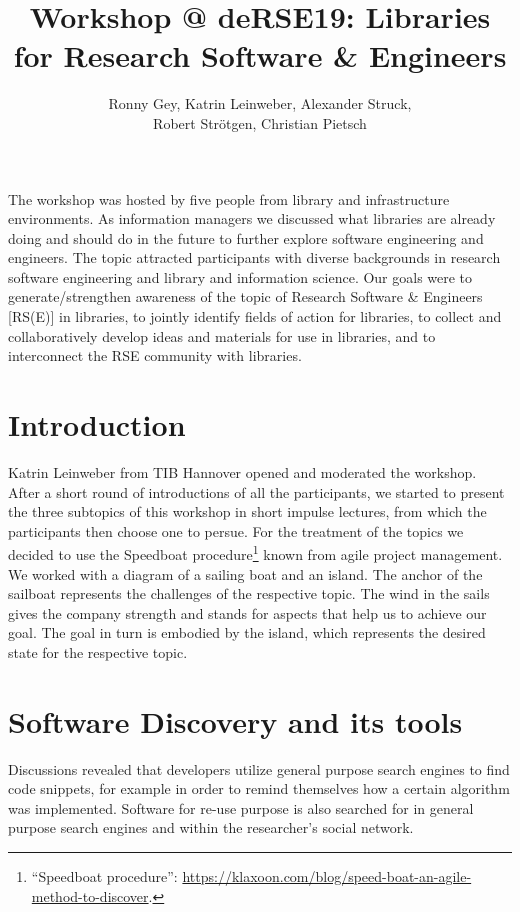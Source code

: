 \documentclass[a4paper,
fontsize=11pt,
oneside,
numbers=noperiodatend,
parskip=half-,
bibliography=totoc,
final
]{scrartcl}
\title{\LARGE{Workshop @ deRSE19: Libraries for Research Software \& Engineers}} %
\author{Ronny Gey, Katrin Leinweber, Alexander Struck, \\Robert Strötgen, Christian Pietsch} %
\date{}
\begin{document}
\maketitle
\thispagestyle{fancyplain} 


The workshop was hosted by five people from library and infrastructure
environments. As information managers we discussed what libraries are
already doing and should do in the future to further explore software
engineering and engineers. The topic attracted participants with diverse
backgrounds in research software engineering and library and information
science. Our goals were to generate/strengthen awareness of the topic of
Research Software \& Engineers {[}RS(E){]} in libraries, to jointly
identify fields of action for libraries, to collect and collaboratively
develop ideas and materials for use in libraries, and to interconnect
the RSE community with libraries.

\hypertarget{introduction}{%
\section{Introduction}\label{introduction}}

Katrin Leinweber from TIB Hannover opened and moderated the workshop.
After a short round of introductions of all the participants, we started
to present the three subtopics of this workshop in short impulse
lectures, from which the participants then choose one to persue. For the
treatment of the topics we decided to use the Speedboat
procedure\footnote{``Speedboat procedure'':
  \url{https://klaxoon.com/blog/speed-boat-an-agile-method-to-discover}.}
known from agile project management. We worked with a diagram of a
sailing boat and an island. The anchor of the sailboat represents the
challenges of the respective topic. The wind in the sails gives the
company strength and stands for aspects that help us to achieve our
goal. The goal in turn is embodied by the island, which represents the
desired state for the respective topic.

\hypertarget{software-discovery-and-its-tools}{%
\section{Software Discovery and its
tools}\label{software-discovery-and-its-tools}}

Discussions revealed that developers utilize general purpose search
engines to find code snippets, for example in order to remind themselves
how a certain algorithm was implemented. Software for re-use purpose is
also searched for in general purpose search engines and within the
researcher's social network.
\end{document}
